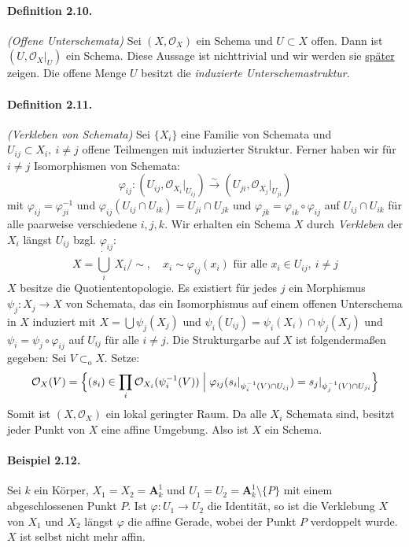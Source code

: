 \paragraph{Definition 2.10.}\label{2.10} \textit{(Offene Unterschemata)} Sei $(X,\mathcal{O}_X)$ ein Schema und $U\subset X$ offen. Dann ist $(U,\mathcal{O}_X|_U)$ ein Schema. Diese Aussage ist nichttrivial und wir werden sie \hyperref[2.10-beweis]{später} zeigen. Die offene Menge $U$ besitzt die \textit{induzierte Unterschemastruktur}.

\paragraph{Definition 2.11.}\label{2.11} \textit{(Verkleben von Schemata)} Sei $\{X_i\}$ eine Familie von Schemata und $U_{ij}\subset X_i,\ i\neq j$ offene Teilmengen mit induzierter Struktur. Ferner haben wir für  $i\neq j$ Isomorphismen von Schemata:
\[\varphi_{ij}: (U_{ij},\mathcal{O}_{X_i}|_{U_{ij}}) \stackrel{\sim}{\to} (U_{ji},\mathcal{O}_{X_j}|_{U_{ji}}) \]
mit $\varphi_{ij}=\varphi_{ji}^{-1}$ und $\varphi_{ij}(U_{ij}\cap U_{ik})=U_{ji}\cap U_{jk}$ und $\varphi_{jk}=\varphi_{ik}\circ\varphi_{ij}$ auf $U_{ij}\cap U_{ik}$ für alle paar\-wei\-se verschiedene $i,j,k$. Wir erhalten ein Schema $X$ durch \textit{Verkleben} der $X_i$ längst $U_{ij}$ bzgl. $\varphi_{ij}$:
\[X=\dot{\bigcup_i}\ X_i\Big/{\sim},\quad x_i\sim\varphi_{ij}(x_i)\text{ für alle }x_i\in U_{ij},\ i\neq j \]
$X$ besitze die Quotiententopologie. Es existiert für jedes $j$ ein Morphismus $\psi_j:X_j\to X$ von Schemata, das ein Isomorphismus auf einem offenen Unterschema in $X$ induziert mit $X=\bigcup\psi_j(X_j)$ und $\psi_i(U_{ij})=\psi_i(X_i)\cap \psi_j(X_j)$ und $\psi_i=\psi_j\circ\varphi_{ij}$ auf $U_{ij}$ für alle $i\neq j$. Die Strukturgarbe auf $X$ ist folgendermaßen gegeben: Sei $V\subset_\text{o} X$. Setze:
\[\mathcal{O}_X(V)=\Big\{ (s_i)\in\prod_i \mathcal{O}_{X_i}(\psi_i^{-1}(V))\Bigm| \varphi_{ij}(s_i|_{\psi_i^{-1}(V)\cap U_{ij}}) = s_j|_{\psi_j^{-1}(V)\cap U_{ji}} \Big\} \]
Somit ist $(X,\mathcal{O}_X)$ ein lokal geringter Raum. Da alle $X_i$ Schemata sind, besitzt jeder Punkt von $X$ eine affine Umgebung. Also ist $X$ ein Schema.

\paragraph{Beispiel 2.12.}\label{2.12} Sei $k$ ein Körper, $X_1=X_2=\mathbf{A}_k^1$ und $U_1=U_2=\mathbf{A}_k^1\setminus\{P\}$ mit einem abgeschlossenen Punkt $P$. Ist $\varphi:U_1\to U_2$ die Identität, so ist die Verklebung $X$ von $X_1$ und $X_2$ längst $\varphi$ die affine Gerade, wobei der Punkt $P$ verdoppelt wurde. $X$ ist selbst nicht mehr affin.

